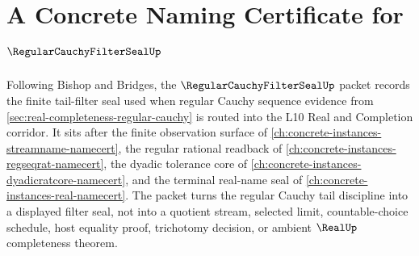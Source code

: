 \chapter{A Concrete Naming Certificate for $\RegularCauchyFilterSealUp$}
\label{ch:concrete-instances-regular-cauchy-filter-seal-namecert}

Following Bishop and Bridges, the $\RegularCauchyFilterSealUp$ packet records the finite tail-filter seal used when regular Cauchy sequence evidence from \autoref{sec:real-completeness-regular-cauchy} is routed into the L10 Real and Completion corridor. It sits after the finite observation surface of \autoref{ch:concrete-instances-streamname-namecert}, the regular rational readback of \autoref{ch:concrete-instances-regseqrat-namecert}, the dyadic tolerance core of \autoref{ch:concrete-instances-dyadicratcore-namecert}, and the terminal real-name seal of \autoref{ch:concrete-instances-real-namecert}. The packet turns the regular Cauchy tail discipline into a displayed filter seal, not into a quotient stream, selected limit, countable-choice schedule, host equality proof, trichotomy decision, or ambient $\RealUp$ completeness theorem.

